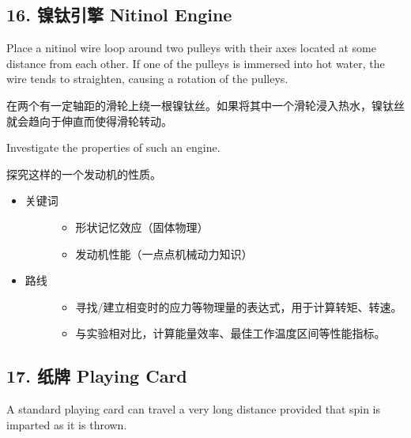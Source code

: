 \documentclass[a4paper,10pt,english]{sphinxmanual}
\begin{document}
\subsection{16. 镍钛引擎 Nitinol Engine}
\label{\detokenize{8. Appendix:nitinol-engine}}
Place a nitinol wire loop around two pulleys with their axes located at some distance from each other. If one of the pulleys is immersed into hot water, the wire tends to straighten, causing a rotation of the pulleys.

在两个有一定轴距的滑轮上绕一根镍钛丝。如果将其中一个滑轮浸入热水，镍钛丝就会趋向于伸直而使得滑轮转动。

Investigate the properties of such an engine.

探究这样的一个发动机的性质。
\begin{itemize}
\item {} \begin{description}
\item[{关键词}] \leavevmode\begin{itemize}
\item {} 
形状记忆效应（固体物理）

\item {} 
发动机性能（一点点机械动力知识）

\end{itemize}

\end{description}

\item {} \begin{description}
\item[{路线}] \leavevmode\begin{itemize}
\item {} 
寻找/建立相变时的应力等物理量的表达式，用于计算转矩、转速。

\item {} 
与实验相对比，计算能量效率、最佳工作温度区间等性能指标。

\end{itemize}

\end{description}

\end{itemize}


\subsection{17. 纸牌 Playing Card}
\label{\detokenize{8. Appendix:playing-card}}
A standard playing card can travel a very long distance provided that spin is imparted as it is thrown.
\end{document}
